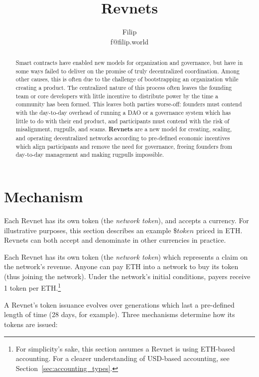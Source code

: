 \documentclass{article}
\title{Revnets}
\author{Filip\\f@filip.world}
\begin{document}
\maketitle

\begin{abstract}
  Smart contracts have enabled new models for organization and governance, but have in some ways failed to deliver on the promise of truly decentralized coordination. Among other causes, this is often due to the challenge of bootstrapping an organization while creating a product. The centralized nature of this process often leaves the founding team or core developers with little incentive to distribute power by the time a community has been formed. This leaves both parties worse-off: founders must contend with the day-to-day overhead of running a DAO or a governance system which has little to do with their end product, and participants must contend with the risk of misalignment, rugpulls, and scams. \textbf{Revnets} are a new model for creating, scaling, and operating decentralized networks according to pre-defined economic incentives which align participants and remove the need for governance, freeing founders from day-to-day management and making rugpulls impossible.
\end{abstract}

\clearpage

\section{Mechanism}

Each Revnet has its own token (the \textit{network token}), and accepts a currency. For illustrative purposes, this section describes an example $\$token$ priced in ETH. Revnets can both accept and denominate in other currencies in practice.

Each Revnet has its own token (the \textit{network token}) which represents a claim on the network's revenue. Anyone can pay ETH into a network to buy its token (thus joining the network). Under the network's initial conditions, payers receive 1 token per ETH.\footnote{For simplicity's sake, this section assumes a Revnet is using ETH-based accounting. For a clearer understanding of USD-based accounting, see Section~\ref{sec:accounting_types}.}

A Revnet's token issuance evolves over generations which last a pre-defined length of time (28 days, for example). Three mechanisms determine how its tokens are issued:
\end{document}
